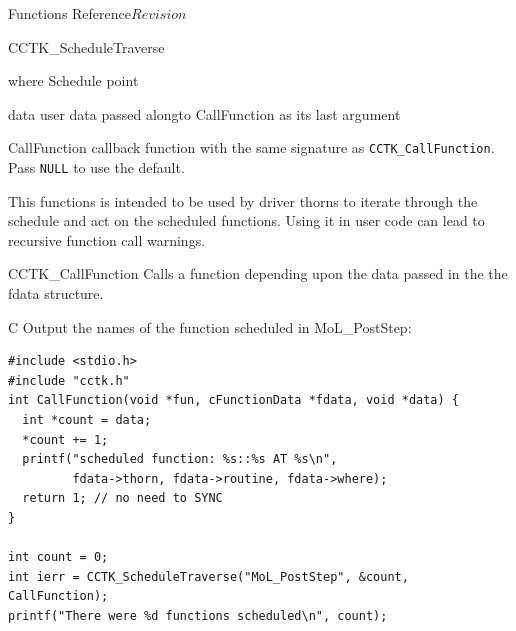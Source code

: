 \begin{cactuspart}{ Functions Reference}{}{$Revision$}
\begin{FunctionDescription}{CCTK\_ScheduleTraverse}
  \begin{ParameterSection}
    \begin{Parameter}{where}
      Schedule point
    \end{Parameter}
    \begin{Parameter}{data}
      user data passed alongto CallFunction as its last argument
    \end{Parameter}
    \begin{Parameter}{CallFunction}
      callback function with the same signature as
        \texttt{CCTK\_CallFunction}. Pass \texttt{NULL} to use the default.
    \end{Parameter}
  \end{ParameterSection}

  \begin{Discussion}
    This functions is intended to be used by driver thorns to iterate through
    the schedule and act on the scheduled functions.  Using it in user code
    can lead to recursive function call warnings.
  \end{Discussion}

  \begin{SeeAlsoSection}
    \begin{SeeAlso}{CCTK\_CallFunction}
      Calls a function depending upon the data passed in the the fdata
      structure.
    \end{SeeAlso}
  \end{SeeAlsoSection}

  \begin{ExampleSection}
    \begin{Example}{C}
      Output the names of the function scheduled in MoL\_PostStep:
\begin{verbatim}
#include <stdio.h>
#include "cctk.h"
int CallFunction(void *fun, cFunctionData *fdata, void *data) {
  int *count = data;
  *count += 1;
  printf("scheduled function: %s::%s AT %s\n",
         fdata->thorn, fdata->routine, fdata->where);
  return 1; // no need to SYNC
}

int count = 0;
int ierr = CCTK_ScheduleTraverse("MoL_PostStep", &count, CallFunction);
printf("There were %d functions scheduled\n", count);
\end{verbatim}
\end{Example}
  \end{ExampleSection}

\end{FunctionDescription}





\end{cactuspart}

